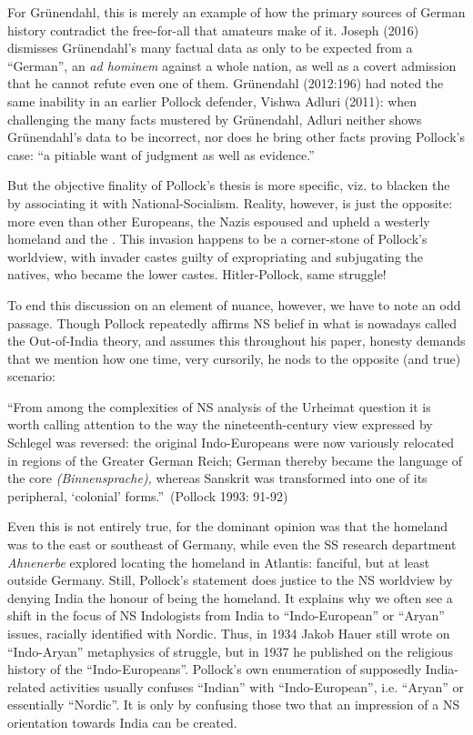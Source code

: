 For Grünendahl, this is merely an example of how the primary sources of German history contradict the free-for-all that amateurs make of it. Joseph (2016) dismisses Grünendahl’s many factual data as only to be expected from a “German”, an {\sl ad hominem} against a whole nation, as well as a covert admission that he cannot refute even one of them. Grünendahl (2012:196) had noted the same inability in an earlier Pollock defender, Vishwa Adluri (2011): when challenging the many facts mustered by Grünendahl, Adluri neither shows Grünendahl’s data to be incorrect, nor does he bring other facts proving Pollock’s case: “a pitiable want of judgment as well as evidence.”

But the objective finality of Pollock’s thesis is more specific, viz. to blacken the  by associating it with National-Socialism. Reality, however, is just the opposite: more even than other Europeans, the Nazis espoused and upheld a westerly homeland and the . This invasion happens to be a corner-stone of Pollock’s worldview, with invader castes guilty of expropriating and subjugating the natives, who became the lower castes. Hitler-Pollock, same struggle!

To end this discussion on an element of nuance, however, we have to note an odd passage.
Though Pollock repeatedly affirms NS belief in what is nowadays called the Out-of-India theory, and assumes this throughout his paper, honesty demands that we mention how one time, very cursorily, he nods to the opposite (and true) scenario: 
\begin{myquote}
“From among the complexities of NS analysis of the Urheimat question it is worth calling attention to the way the nineteenth-century view expressed by Schlegel was reversed: the original Indo-Europeans were now variously relocated in regions of the Greater German Reich; German thereby became the language of the core {\sl (Binnensprache),} whereas Sanskrit was transformed into one of its peripheral, ‘colonial’ forms.”~\hfill(Pollock 1993: 91-92)
\end{myquote}

Even this is not entirely true, for the dominant opinion was that the homeland was to the east or southeast of Germany, while even the SS research department {\sl Ahnenerbe} explored locating the homeland in Atlantis: fanciful, but at least outside Germany. Still, Pollock’s statement does justice to the NS worldview by denying India the honour of being the homeland. It explains why we often see a shift in the focus of NS Indologists from India to “Indo-European” or “Aryan” issues, racially identified with Nordic. Thus, in 1934 Jakob Hauer still wrote on “Indo-Aryan” metaphysics of struggle, but in 1937 he published on the religious history of the “Indo-Europeans”. Pollock’s own enumeration of supposedly India-related activities usually confuses “Indian” with “Indo-European”, i.e. “Aryan” or essentially “Nordic”. It is only by confusing those two that an impression of a NS orientation towards India can be created.

